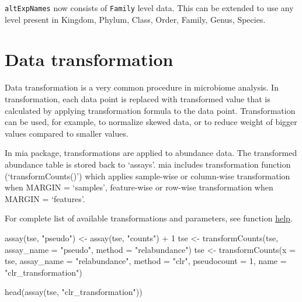 \documentclass[
]{book}
\newenvironment{Shaded}{\begin{snugshade}}{\end{snugshade}}
\newcommand{\AttributeTok}[1]{\textcolor[rgb]{0.77,0.63,0.00}{#1}}
\newcommand{\DecValTok}[1]{\textcolor[rgb]{0.00,0.00,0.81}{#1}}
\newcommand{\FunctionTok}[1]{\textcolor[rgb]{0.00,0.00,0.00}{#1}}
\newcommand{\NormalTok}[1]{#1}
\newcommand{\OtherTok}[1]{\textcolor[rgb]{0.56,0.35,0.01}{#1}}
\newcommand{\SpecialCharTok}[1]{\textcolor[rgb]{0.00,0.00,0.00}{#1}}
\newcommand{\StringTok}[1]{\textcolor[rgb]{0.31,0.60,0.02}{#1}}
\begin{document}
\texttt{altExpNames} now consists of \texttt{Family} level data. This can be extended to use
any level present in Kingdom, Phylum, Class, Order, Family, Genus, Species.

\hypertarget{data-transformation}{%
\section{Data transformation}\label{data-transformation}}

Data transformation is a very common procedure in microbiome analysis.
In transformation, each data point is replaced with transformed value that is
calculated by applying transformation formula to the data point. Transformation
can be used, for example, to normalize skewed data, or to reduce weight of bigger
values compared to smaller values.

In mia package, transformations are applied to abundance data. The transformed
abundance table is stored back to `assays'. mia includes transformation
function (`transformCounts()') which applies sample-wise or column-wise transformation when MARGIN = `samples', feature-wise or row-wise transformation when MARGIN = `features'.

For complete list of available transformations and parameters, see function
\href{https://microbiome.github.io/mia/reference/transformCounts.html}{help}.

\begin{Shaded}
\begin{Highlighting}[]
\FunctionTok{assay}\NormalTok{(tse, }\StringTok{"pseudo"}\NormalTok{) }\OtherTok{\textless{}{-}} \FunctionTok{assay}\NormalTok{(tse, }\StringTok{"counts"}\NormalTok{) }\SpecialCharTok{+} \DecValTok{1}
\NormalTok{tse }\OtherTok{\textless{}{-}} \FunctionTok{transformCounts}\NormalTok{(tse, }\AttributeTok{assay\_name =} \StringTok{"pseudo"}\NormalTok{, }\AttributeTok{method =} \StringTok{"relabundance"}\NormalTok{)}
\NormalTok{tse }\OtherTok{\textless{}{-}} \FunctionTok{transformCounts}\NormalTok{(}\AttributeTok{x =}\NormalTok{ tse, }\AttributeTok{assay\_name =} \StringTok{"relabundance"}\NormalTok{, }\AttributeTok{method =} \StringTok{"clr"}\NormalTok{, }
                        \AttributeTok{pseudocount =} \DecValTok{1}\NormalTok{, }\AttributeTok{name =} \StringTok{"clr\_transformation"}\NormalTok{)}

\FunctionTok{head}\NormalTok{(}\FunctionTok{assay}\NormalTok{(tse, }\StringTok{"clr\_transformation"}\NormalTok{))}
\end{Highlighting}
\end{Shaded}
\end{document}
